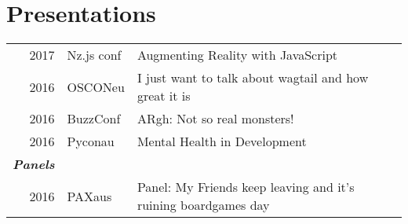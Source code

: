 \documentclass[a4paper]{deedy-resume} %
\begin{document}
\begin{minipage}[t]{0.33\textwidth}
\sectionspace %


\section{Presentations}

\begin{tabular}{rll}
2017 & Nz.js conf & Augmenting Reality with JavaScript\\
2016 & OSCONeu & I just want to talk about wagtail and how great it is\\
2016 & BuzzConf & ARgh: Not so real monsters!\\
2016 & Pyconau & Mental Health in Development\\
{\footnotesize \textit{\textbf{Panels}}} \\
2016 & PAXaus & Panel: My Friends keep leaving and it's ruining boardgames day\\
\end{tabular}

\sectionspace %









\end{minipage}
\end{document}
